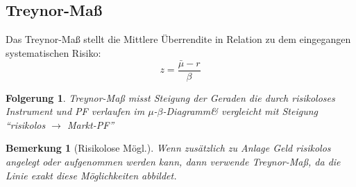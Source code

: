 \documentclass[a4paper]{article}
\theoremstyle{break}
\newcommand{\mbd}{$\mu$-$\beta$-Diagramm}
\newtheorem{ann}{Bemerkung}[section]
\newtheorem{der}{Folgerung}[section]
\begin{document}
\subsection{Treynor-Maß}
    Das Treynor-Maß stellt die Mittlere Überrendite in Relation zu dem eingegangen systematischen Risiko:
    $$z = \frac{\bar{\mu} - r}{\beta}$$
    \begin{der}
       Treynor-Maß misst Steigung der Geraden die durch risikoloses Instrument und PF verlaufen im \mbd \& vergleicht mit Steigung ``risikolos $\rightarrow$ Markt-PF''
    \end{der}
    \begin{ann}[Risikolose Mögl.]
        Wenn zusätzlich zu Anlage Geld risikolos angelegt oder aufgenommen werden kann, dann verwende Treynor-Maß, da die Linie exakt diese Möglichkeiten abbildet.
    \end{ann}
\end{document}
